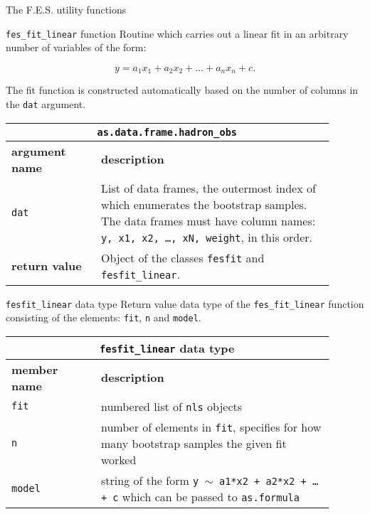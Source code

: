\documentclass[10pt,a4paper]{article}
\begin{document}
\begin{section}{The F.E.S. utility functions}

\begin{subsection}{ {\tt fes\_fit\_linear} function }
Routine which carries out a linear fit in an arbitrary number of variables of the form:

\begin{equation}
y=a_1 x_1 + a_2 x_2 + \ldots + a_n x_n + c.
\end{equation}

The fit function is constructed automatically based on the number of columns in the {\tt dat} argument.

{ \centering
\begin{tabular}{|p{0.25\linewidth}|p{0.65\linewidth}|}
\hline
\multicolumn{2}{|c|}{ {\tt as.data.frame.hadron\_obs} } \\
\hline \hline \textbf{argument name} & \textbf{description} \\ \hline
{\tt dat} & List of data frames, the outermost index of which enumerates the bootstrap samples.
The data frames must have column names: {\tt y, x1, x2, \ldots, xN, weight}, in this order. \\
\hline 
\textbf{return value} & Object of the classes {\tt fesfit} and {\tt fesfit\_linear}. \\
\hline
\end{tabular}
} %

\end{subsection}

\begin{subsection}{ {\tt fesfit\_linear} data type }
Return value data type of the {\tt fes\_fit\_linear} function consisting of the elements: {\tt fit}, {\tt n} and {\tt model}.

{ \centering
\begin{tabular}{|p{0.25\linewidth}|p{0.65\linewidth}|}
\hline
\multicolumn{2}{|c|}{ {\tt fesfit\_linear} data type } \\
\hline \hline \textbf{member name} & \textbf{description} \\ \hline
{\tt fit} & numbered list of {\tt nls} objects \\ 
{\tt n}  & number of elements in {\tt fit}, specifies for how many bootstrap samples the given fit worked \\ 
{\tt model} & string of the form {\tt y $\sim$ a1*x2 + a2*x2 + \ldots + c} which can be passed to {\tt as.formula} \\
\hline 
\end{tabular}
} %


\end{subsection}
\end{section}
\end{document}

